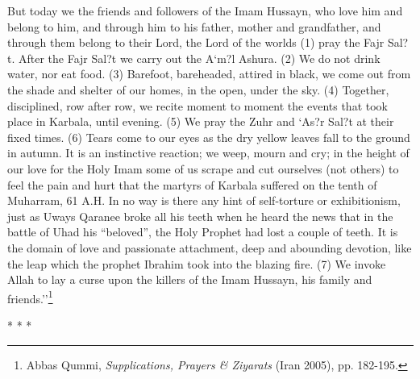 But today we the friends and followers of the Imam Hussayn, who love him and belong to him, and through him to his father, mother and grandfather, and through them belong to their Lord, the Lord of the worlds (1) pray the Fajr Sal?t. After the Fajr Sal?t we carry out the A`m?l Ashura. (2) We do not drink water, nor eat food. (3) Barefoot, bareheaded, attired in black, we come out from the shade and shelter of our homes, in the open, under the sky. (4) Together, disciplined, row after row, we recite moment to moment the events that took place in Karbala, until evening. (5) We pray the Zuhr and `As?r Sal?t at their fixed times. (6) Tears come to our eyes as the dry yellow leaves fall to the ground in autumn. It is an instinctive reaction; we weep, mourn and cry; in the height of our love for the Holy Imam some of us scrape and cut ourselves (not others) to feel the pain and hurt that the martyrs of Karbala suffered on the tenth of Muharram, 61 A.H. In no way is there any hint of self-torture or exhibitionism, just as Uways Qaranee broke all his teeth when he heard the news that in the battle of Uhad his ``beloved'', the Holy Prophet had lost a couple of teeth. It is the domain of love and passionate attachment, deep and abounding devotion, like the leap which the prophet Ibrahim took into the blazing fire. (7) We invoke Allah to lay a curse upon the killers of the Imam Hussayn, his family and friends.''\footnote{Abbas Qummi, \emph{Supplications, Prayers \& Ziyarats} (Iran 2005), pp. 182-195.}



\begin{center}* * *\end{center}

